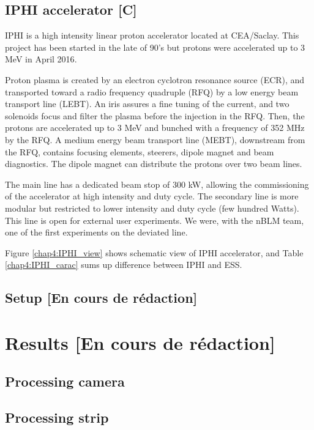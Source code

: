 \begin{refsection}
  \subsection{IPHI accelerator [C]}
  IPHI is a high intensity linear proton accelerator located at CEA/Saclay.
  This project has been started in the late of 90's\cite{Beau2000} but protons were accelerated up to 3 MeV in April 2016\cite{Gobin2016}.

  Proton plasma is created by an electron cyclotron resonance source (ECR), and transported toward a radio frequency quadruple (RFQ) by a low energy beam transport line (LEBT).
  An iris assures a fine tuning of the current, and two solenoids focus and filter the plasma before the injection in the RFQ.
  Then, the protons are accelerated up to 3 MeV and bunched with a frequency of 352 MHz by the RFQ.
  A medium energy beam transport line (MEBT), downstream from the RFQ, contains focusing elements, steerers, dipole magnet and beam diagnostics.
  The dipole magnet can distribute the protons over two beam lines.

  The main line has a dedicated beam stop of 300 kW, allowing the commissioning of the accelerator at high intensity and duty cycle.
  The secondary line is more modular but restricted to lower intensity and duty cycle (few hundred Watts).
  This line is open for external user experiments.
  We were, with the nBLM team, one of the first experiments on the deviated line\cite{Senee:IPAC2018-TUPAF016}.

  Figure \ref{chap4:IPHI_view} shows schematic view of IPHI accelerator, and Table \ref{chap4:IPHI_carac} sums up difference between IPHI and ESS.

  
  

  \subsection{Setup [En cours de rédaction]}

  \section{Results [En cours de rédaction]}
  \subsection{Processing camera}
  \subsection{Processing strip}
  \cite{Brun1997,Antcheva2009}

\end{refsection}
